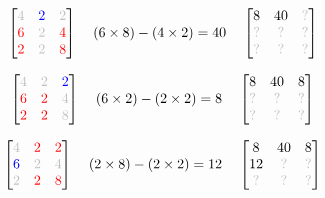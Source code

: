 \documentclass[11pt]{article}
\begin{document}
\begin{equation}\begin{bmatrix}\color{lightgray}4 & \color{blue}2 & \color{lightgray}2\\\color{red}6 & \color{lightgray}2 & \color{red}4\\\color{red}2 & \color{lightgray}2 & \color{red}8\end{bmatrix}\;\;\;\;(6\times8) - (4\times2) = 40\;\;\;\;\begin{bmatrix}8 & 40 & \color{lightgray}?\\\color{lightgray}? & \color{lightgray}? & \color{lightgray}?\\\color{lightgray}? & \color{lightgray}? & \color{lightgray}?\end{bmatrix}\end{equation}

\begin{equation}\begin{bmatrix}\color{lightgray}4 & \color{lightgray}2 & \color{blue}2\\\color{red}6 & \color{red}2 & \color{lightgray}4\\\color{red}2 & \color{red}2 & \color{lightgray}8\end{bmatrix}\;\;\;\;(6\times2) - (2\times2) = 8\;\;\;\;\begin{bmatrix}8 & 40 & 8\\\color{lightgray}? & \color{lightgray}? & \color{lightgray}?\\\color{lightgray}? & \color{lightgray}? & \color{lightgray}?\end{bmatrix} \end{equation}

\begin{equation}\begin{bmatrix}\color{lightgray}4 & \color{red}2 & \color{red}2\\\color{blue}6 & \color{lightgray}2 & \color{lightgray}4\\\color{lightgray}2 & \color{red}2 & \color{red}8\end{bmatrix}\;\;\;\;(2\times8) - (2\times2) = 12\;\;\;\;\begin{bmatrix}8 & 40 & 8\\12 & \color{lightgray}? & \color{lightgray}?\\\color{lightgray}? & \color{lightgray}? & \color{lightgray}?\end{bmatrix} \end{equation}
\end{document}

